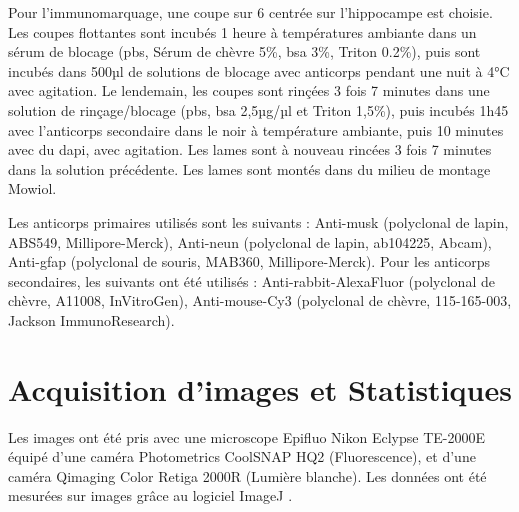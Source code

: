 	Pour l'immunomarquage, une coupe sur 6 centrée sur l'hippocampe est choisie. Les coupes flottantes sont incubés 1 heure à températures ambiante dans un sérum de blocage (\gls{pbs}, Sérum de chèvre 5\%, \gls{bsa} 3\%, Triton 0.2\%), puis sont incubés dans 500µl de solutions de blocage avec anticorps pendant une nuit à 4°C avec agitation. Le lendemain, les coupes sont rinçées 3 fois 7 minutes dans une solution de rinçage/blocage (\gls{pbs}, \gls{bsa} 2,5µg/µl et Triton 1,5\%), puis incubés 1h45 avec l'anticorps secondaire dans le noir à température ambiante, puis 10 minutes avec du \gls{dapi}, avec agitation. Les lames sont à nouveau rincées 3 fois 7 minutes dans la solution précédente. Les lames sont montés dans du milieu de montage Mowiol.
	
	Les anticorps primaires utilisés sont les suivants : Anti-\acrshort{musk} (polyclonal de lapin, ABS549, Millipore-Merck),  Anti-\acrshort{neun} (polyclonal de lapin, ab104225, Abcam), Anti-\acrshort{gfap} (polyclonal de souris, MAB360, Millipore-Merck). Pour les anticorps secondaires, les suivants ont été utilisés : Anti-rabbit-AlexaFluor (polyclonal de chèvre, A11008, InVitroGen), Anti-mouse-Cy3 (polyclonal de chèvre, 115-165-003, Jackson ImmunoResearch).
	
\section{Acquisition d'images et Statistiques}
\label{sec:ImagesStats}
	Les images ont été pris avec une microscope Epifluo Nikon Eclypse TE-2000E équipé d'une caméra Photometrics CoolSNAP HQ2 (Fluorescence), et d'une caméra Qimaging Color Retiga 2000R (Lumière blanche).
	Les données ont été mesurées sur images grâce au logiciel ImageJ \cite{Schneider2012}.